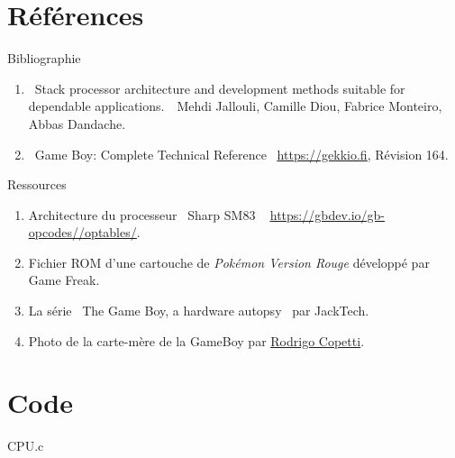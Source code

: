\documentclass{beamer}
\begin{document}
    \appendix
    \section{Références}
    \begin{frame}{Bibliographie}
        \begin{enumerate}
            \item \guillemotleft\ Stack processor architecture and development methods suitable for dependable
applications.\ \guillemotright\ Mehdi Jallouli, Camille Diou, Fabrice Monteiro, Abbas Dandache.
            \item \guillemotleft\ Game Boy: Complete Technical Reference \guillemotright\ {\color{blue}\underline{\url{https://gekkio.fi}}}, Révision 164.
        \end{enumerate}
    \end{frame}

    \begin{frame}{Ressources}
        \begin{enumerate}
            \item Architecture du processeur \guillemotleft\ Sharp SM83 \guillemotright\ {\color{blue} \underline{\url{https://gbdev.io/gb-opcodes//optables/}}}.
            \item Fichier ROM d'une cartouche de \textit{Pokémon Version Rouge} développé par Game Freak.
            \item La série \guillemotleft\ The Game Boy, a hardware autopsy \guillemotright\ par JackTech.
            \item Photo de la carte-mère de la GameBoy par {\color{blue} \underline{\href{https://www.copetti.org/writings/consoles/game-boy/}{Rodrigo Copetti}}}.
        \end{enumerate}
    \end{frame}

    \section{Code}
    \begin{frame}{CPU.c}
    \end{frame}
    
\end{document}
